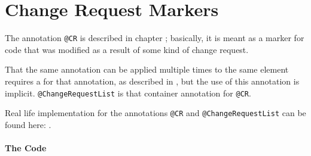 \section{Change Request Markers}\label{code:CR}
The annotation \lstinline|@CR| is described in chapter ; basically, it is meant as a marker for code that was modified as a result of some kind of change request.

That the same annotation can be applied multiple times to the same element requires a  for that annotation, as described in \autocite{ORACLE_DOC_LANGUAGE_SPECIFICATION:RepeatableAnnotationInterfaces}, but the use of this annotation is implicit. \lstinline|@ChangeRequestList| is that container annotation for \lstinline|@CR|.

Real life implementation for the annotations \lstinline|@CR| and \lstinline|@ChangeRequestList| can be found here: \autocite{TQUADRAT_ORG_FOUNDATION_BASE, TQUADRAT_ORG_FOUNDATION_BUG, TQUADRAT_ORG_FOUNDATION_FIXLIST}.


\paragraph{The Code}\






